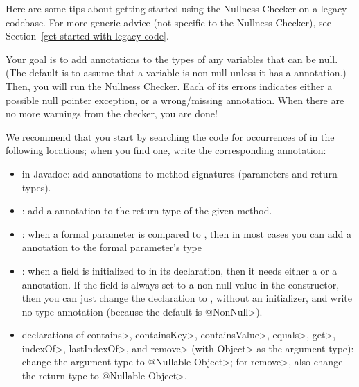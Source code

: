 Here are some tips about getting started using the Nullness Checker on a
legacy codebase.  For more generic advice (not specific to the Nullness
Checker), see Section~\ref{get-started-with-legacy-code}.

Your goal is to add  annotations
to the types of any variables that can be null.  (The default is to assume
that a variable is non-null unless it has a  annotation.)
Then, you will run the Nullness Checker.  Each of its errors indicates
either a possible null pointer exception, or a wrong/missing annotation.
When there are no more warnings from the checker, you are done!

We recommend that you start by searching the code for occurrences of
 in the following locations; when you find one, write the
corresponding annotation:

\begin{itemize}
\item
  in Javadoc:  add  annotations to method signatures (parameters and return types).
\item
  :  add a  annotation to the return type
  of the given method.
\item
  :  when a formal parameter is compared to
  , then in most cases you can add a  annotation
  to the formal parameter's type
\item
  :  when a field is initialized to
   in its declaration, then it needs either a
   or a
   annotation.  If the field
  is always set to a non-null value in the constructor, then you can just
  change the declaration to , without an
  initializer, and write no type annotation (because the default is
  \<@NonNull>).
\item
  declarations of \<contains>, \<containsKey>, \<containsValue>, \<equals>,
  \<get>, \<indexOf>, \<lastIndexOf>, and \<remove> (with \<Object> as the
  argument type):
  change the argument type to \<@Nullable Object>; for \<remove>, also change
  the return type to \<@Nullable Object>.

\end{itemize}

